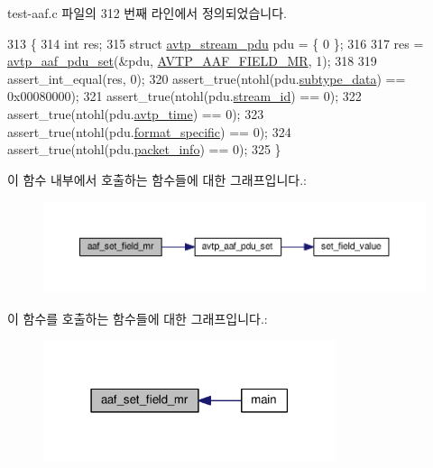 test-\/aaf.\+c 파일의 312 번째 라인에서 정의되었습니다.


\begin{DoxyCode}
313 \{
314     \textcolor{keywordtype}{int} res;
315     \textcolor{keyword}{struct }\hyperlink{structavtp__stream__pdu}{avtp\_stream\_pdu} pdu = \{ 0 \};
316 
317     res = \hyperlink{avtp__aaf_8h_af242dc7ed6c5ca5ea8e9d5071c13e19d}{avtp\_aaf\_pdu\_set}(&pdu, \hyperlink{avtp__aaf_8h_a7eaee6c1ebc806c0401dbe7b14cd22dba7eb52ad27551549484048c7c54ff9bf3}{AVTP\_AAF\_FIELD\_MR}, 1);
318 
319     assert\_int\_equal(res, 0);
320     assert\_true(ntohl(pdu.\hyperlink{structavtp__stream__pdu_a3210e9f18fdc9c29cef7600c4d1e67e9}{subtype\_data}) == 0x00080000);
321     assert\_true(ntohl(pdu.\hyperlink{structavtp__stream__pdu_af5af7b461263e29ceb91a8d3a8bc2c97}{stream\_id}) == 0);
322     assert\_true(ntohl(pdu.\hyperlink{structavtp__stream__pdu_a81ec49d93f7a916531f4d97214f47515}{avtp\_time}) == 0);
323     assert\_true(ntohl(pdu.\hyperlink{structavtp__stream__pdu_acbfc36b550978f88cf0a3d9d2b2ce0dd}{format\_specific}) == 0);
324     assert\_true(ntohl(pdu.\hyperlink{structavtp__stream__pdu_a737b6c4ff9f6954da39283e7351cbf58}{packet\_info}) == 0);
325 \}
\end{DoxyCode}


이 함수 내부에서 호출하는 함수들에 대한 그래프입니다.\+:
\nopagebreak
\begin{figure}[H]
\begin{center}
\leavevmode
\includegraphics[width=350pt]{test-aaf_8c_ab2e163995b190924ff502301b23cb18f_cgraph}
\end{center}
\end{figure}




이 함수를 호출하는 함수들에 대한 그래프입니다.\+:
\nopagebreak
\begin{figure}[H]
\begin{center}
\leavevmode
\includegraphics[width=243pt]{test-aaf_8c_ab2e163995b190924ff502301b23cb18f_icgraph}
\end{center}
\end{figure}


